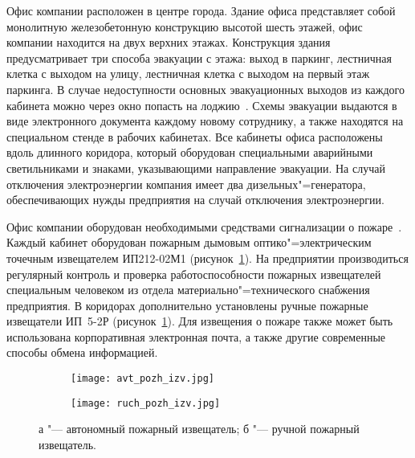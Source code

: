 Офис компании расположен в центре города.
Здание офиса представляет собой монолитную железобетонную конструкцию высотой шесть этажей, офис компании находится на двух верхних этажах.
Конструкция здания предусматривает три способа эвакуации с этажа: выход в паркинг, лестничная клетка с выходом на улицу, лестничная клетка с выходом на первый этаж паркинга.
В случае недоступности основных эвакуационных выходов из каждого кабинета можно через окно попасть на лоджию~\cite[\ignore{раздел~5.5.4,} с.~314\,--\,316]{michnuk_2009}.
Схемы эвакуации выдаются в виде электронного документа каждому новому сотруднику, а также находятся на специальном стенде в рабочих кабинетах.
Все кабинеты офиса расположены вдоль длинного коридора, который оборудован специальными аварийными светильниками и знаками, указывающими направление эвакуации.
На случай отключения электроэнергии компания имеет два дизельных"=генератора, обеспечивающих нужды предприятия на случай отключения электроэнергии.

Офис компании оборудован необходимыми средствами сигнализации о пожаре~\cite[с.~215]{sinilov_2010}. %
Каждый кабинет оборудован пожарным дымовым оптико"=электрическим точечным извещателем \mbox{ИП212-02М1} (рисунок~\ref{fig:fire_alarms}).
На предприятии производиться регулярный контроль и проверка работоспособности пожарных извещателей специальным человеком из отдела материально"=технического снабжения предприятия.
В коридорах дополнительно установлены ручные пожарные извещатели \mbox{ИП 5-2Р} (рисунок~\ref{fig:fire_alarms}).
Для извещения о пожаре также может быть использована корпоративная электронная почта, а также другие современные способы обмена информацией.

\begin{figure}[ht]
\centering
  \begin{subfigure}[b]{0.45\textwidth}
    \centering
    \texttt{[image: avt\_pozh\_izv.jpg]}
    \caption{}
  \end{subfigure}
  \begin{subfigure}[b]{0.45\textwidth}
    \centering
    \texttt{[image: ruch\_pozh\_izv.jpg]}
    \caption{}
  \end{subfigure}
  \caption{ а "--- автономный пожарный извещатель;
            б "--- ручной пожарный извещатель.}
  \label{fig:fire_alarms}
\end{figure}

